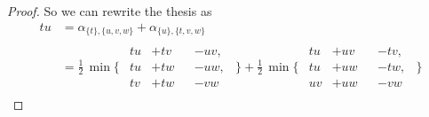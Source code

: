 \documentclass[./main.tex]{subfiles}
\begin{document}
\begin{proof}
    So we can rewrite the thesis as
    \begin{align*}
        tu &= \alpha_{\{t\},\{u,v,w\}} + \alpha_{\{u\},\{t,v,w\}} \\[2pt]
        &= \frac{1}{2}\, \min {\Biggl\{
            \begin{array}{c}
            \begin{alignedat}{2}
                tu &+ tv &&- uv, \\
                tu &+ tw &&- uw, \\
                tv &+ tw &&- vw
            \end{alignedat}
            \end{array}
        \!\!\Biggr\}} + \frac{1}{2}\, \min {\Biggl\{\!
            \begin{array}{c}
            \begin{alignedat}{2}
                tu &+ uv &&- tv, \\
                tu &+ uw &&- tw, \\
                uv &+ uw &&- vw
            \end{alignedat}
            \end{array}
        \!\!\Biggr\}}
    \end{align*} \bigskip


\end{proof}
\end{document}
